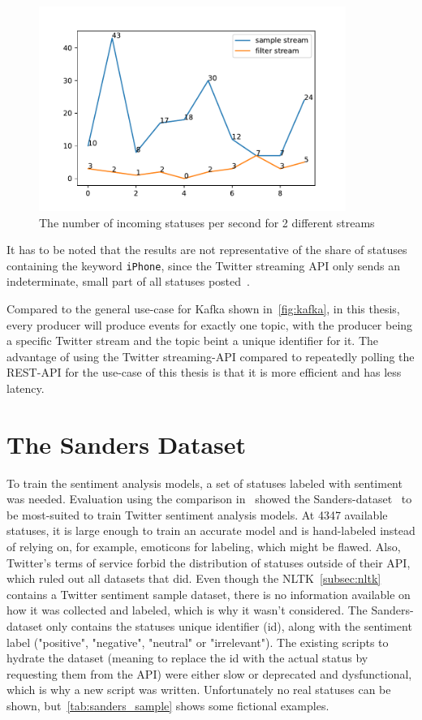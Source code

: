 \begin{figure}
    \centering
    \caption{The number of incoming statuses per second for 2 different streams}
    \label{fig:sanders_sentiment}
    \includegraphics[width=10cm]{../figures/stream_frequencies.pdf}
\end{figure}

It has to be noted that the results are not representative of the share of statuses containing the keyword \texttt{iPhone},
since the Twitter streaming API only sends an indeterminate, small part of all statuses posted~\cite{twitterDocs}.

\par
Compared to the general use-case for Kafka shown in~\ref{fig:kafka}, in this thesis,
every producer will produce events for exactly one topic, with the producer being a specific Twitter stream and the topic beint a unique identifier for it.
The advantage of using the Twitter streaming-API compared to repeatedly polling the REST-API for the use-case of this thesis
is that it is more efficient and has less latency.

\section{The Sanders Dataset}
\label{sec:theSandersDataset}

To train the sentiment analysis models, a set of statuses labeled with sentiment was needed.
Evaluation using the comparison in~\cite{Saif2013} showed the Sanders-dataset~\cite{sanders} to be most-suited to train Twitter sentiment analysis models.
At 4347 available statuses, it is large enough to train an accurate model and is hand-labeled instead of relying on, for example, emoticons for labeling, which might be flawed.
Also, Twitter's terms of service forbid the distribution of statuses outside of their API, which ruled out all datasets that did.
Even though the NLTK~\ref{subsec:nltk} contains a Twitter sentiment sample dataset,
there is no information available on how it was collected and labeled, which is why it wasn't considered.
The Sanders-dataset only contains the statuses unique identifier (id), along with the sentiment label ("positive", "negative", "neutral" or "irrelevant").
The existing scripts to hydrate the dataset (meaning to replace the id with the actual status by requesting them from the API) were either slow or deprecated and dysfunctional,
which is why a new script was written.
Unfortunately no real statuses can be shown, but~\ref{tab:sanders_sample} shows some fictional examples.

